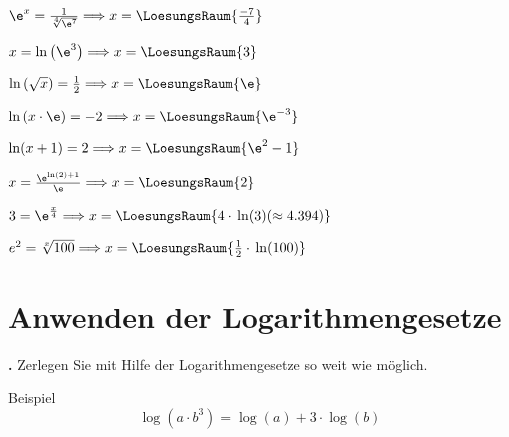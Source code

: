 \begin{bbwAufgabenBlock}
\item $\e^x = \frac1{\sqrt[4]{\e^7}}  \Longrightarrow x =    \LoesungsRaum{\frac{-7}4}$
\item $x = \ln\left(\e^3\right)  \Longrightarrow x =    \LoesungsRaum{3}$
\item $\ln\left(\sqrt{x}\right)  = \frac12  \Longrightarrow x =    \LoesungsRaum{\e}$
\item $\ln\left(x\cdot{} \e \right)  = -2  \Longrightarrow x =    \LoesungsRaum{\e^{-3}}$
\noTRAINER{\newpage}
\item $\ln(x+1) = 2 \Longrightarrow x =    \LoesungsRaum{\e^2 - 1}$
\item $x=\frac{\e^{\ln(2)+1}}{\e} \Longrightarrow x =    \LoesungsRaum{2}$
\item $3 = \e^{\frac{x}4} \Longrightarrow x=    \LoesungsRaum{4\cdot{} \ln(3) (\approx 4.394)}$
\item $e^2 = \sqrt[x]{100} \Longrightarrow x= \LoesungsRaum{\frac12\cdot{}\ln(100)}$
\end{bbwAufgabenBlock}

\newpage

\section{Anwenden der Logarithmengesetze}

\textbf{\bbwAufgabenNummer{}.}
Zerlegen Sie mit Hilfe der Logarithmengesetze so weit wie möglich.

Beispiel $$\log\left(a\cdot{}b^3\right) = \log(a) + 3\cdot{}\log(b)$$


